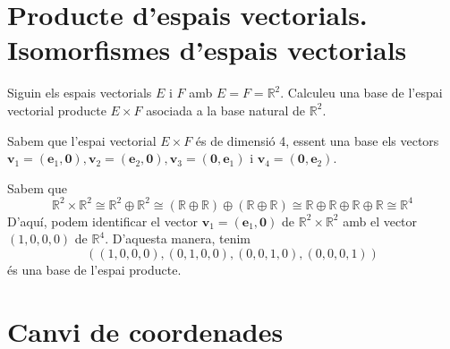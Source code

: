 \section{Producte d’espais vectorials. Isomorfismes d’espais
vectorials}

\begin{exercici}
Siguin els espais vectorials $E$ i $F$ amb $E=%
F=\mathbb{R}^{2}$. Calculeu una base de l’espai vectorial producte
$E\times F$ asociada a la base natural de $\mathbb{R}^{2}$.

\end{exercici}
\begin{solucio}
Sabem que l’espai vectorial $E\times F$ és de dimensió 4, essent una base els vectors $\mathbf{v}_{1}=(\mathbf{e}_{1},%
\mathbf{0}),\mathbf{v}_{2}=(\mathbf{e}_{2},\mathbf{0}),\mathbf{v}_{3}=(%
\mathbf{0},\mathbf{e}_{1})$ i $\mathbf{v}_{4}=(\mathbf{0},\mathbf{e}_{2})$.

Sabem que
\begin{equation*}
\mathbb{R}^{2}\times \mathbb{R}^{2}\cong \mathbb{R}^{2}\oplus \mathbb{R}%
^{2}\cong (\mathbb{R}\oplus \mathbb{R})\oplus (\mathbb{R}\oplus \mathbb{R}%
)\cong \mathbb{R}\oplus \mathbb{R}\oplus \mathbb{R}\oplus \mathbb{R}\cong
\mathbb{R}^{4}
\end{equation*}%
D’aquí, podem identificar el vector $\mathbf{v}_{1}=(\mathbf{e}_{1},%
\mathbf{0})$ de $\mathbb{R}^{2}\times \mathbb{R}^{2}$ amb el vector $%
(1,0,0,0)$ de $\mathbb{R}^{4}$. D’aquesta manera, tenim
\begin{equation*}
((1,0,0,0),(0,1,0,0),(0,0,1,0),(0,0,0,1))
\end{equation*}%
és una base de l’espai producte.
\end{solucio}

\section{Canvi de coordenades}


